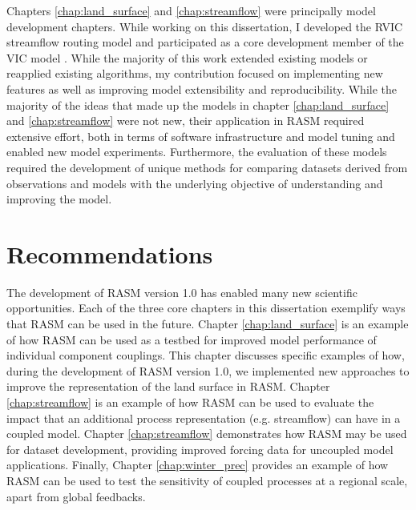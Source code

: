 Chapters \ref{chap:land_surface} and \ref{chap:streamflow} were principally model development chapters.
While working on this dissertation, I developed the RVIC streamflow routing model \citep[see also \ref{sec:rvic_dev} ;][]{Hamman_2015,Hamman_2016b} and participated as a core development member of the VIC model \citep[see also \label{sec:vic_dev}]{Hamman_2016c,Hamman_2016d}.
While the majority of this work extended existing models or reapplied existing algorithms, my contribution focused on implementing new features as well as improving model extensibility and reproducibility.
While the majority of the ideas that made up the models in chapter \ref{chap:land_surface} and \ref{chap:streamflow} were not new, their application in RASM required extensive effort, both in terms of software infrastructure and model tuning and enabled new model experiments.
Furthermore, the evaluation of these models required the development of unique methods for comparing datasets derived from observations and models with the underlying objective of understanding and improving the model.

\section{Recommendations}
The development of RASM version 1.0 has enabled many new scientific opportunities.
Each of the three core chapters in this dissertation exemplify ways that RASM can be used in the future.
Chapter \ref{chap:land_surface} is an example of how RASM can be used as a testbed for improved model performance of individual component couplings.
This chapter discusses specific examples of how, during the development of RASM version 1.0, we implemented new approaches to improve the representation of the land surface in RASM.
Chapter \ref{chap:streamflow} is an example of how RASM can be used to evaluate the impact that an additional process representation (e.g. streamflow) can have in a coupled model.
Chapter \ref{chap:streamflow} demonstrates how RASM may be used for dataset development, providing improved forcing data for uncoupled model applications.
Finally, Chapter \ref{chap:winter_prec} provides an example of how RASM can be used to test the sensitivity of coupled processes at a regional scale, apart from global feedbacks.

